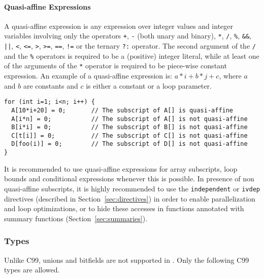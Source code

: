 \paragraph{Quasi-affine Expressions}
\label{sec:quasi-affine}

A quasi-affine expression is any expression over integer values and
integer variables involving only the operators \lstinline{+},
\lstinline{-} (both unary and binary), \lstinline{*}, \lstinline{/},
\lstinline{%}, \lstinline{&&}, \lstinline{||}, \lstinline{<}, \lstinline{<=},
\lstinline{>}, \lstinline{>=}, \lstinline{==}, \lstinline{!=} or the
ternary \lstinline{?:} operator.  The second argument of the
\lstinline{/} and the \lstinline{%}
operators is required to be a (positive) integer literal, while at
least one of the arguments of the \lstinline{*} operator is
required to be piece-wise constant expression. An example of a
quasi-affine expression is: $a*i+b*j+c$, where $a$ and $b$ are
constants and $c$ is either a constant or a loop parameter.

\begin{lstlisting}[language=pencil]
for (int i=1; i<n; i++) {
  A[10*i+20] = 0;       // The subscript of A[] is quasi-affine
  A[i*n] = 0;           // The subscript of A[] is not quasi-affine
  B[i*i] = 0;           // The subscript of B[] is not quasi-affine
  C[t[i]] = 0;          // The subscript of C[] is not quasi-affine
  D[foo(i)] = 0;        // The subscript of D[] is not quasi-affine
}
\end{lstlisting}

It is recommended to use quasi-affine expressions for array subscripts,
loop bounds and conditional expressions whenever this is possible.
In presence of non quasi-affine subscripts, it is highly recommended
to use the \lstinline!independent! or \lstinline!ivdep! directives 
(described in Section~\ref{sec:directives})
in order to enable parallelization and loop optimizations, or to hide these
accesses in functions annotated with summary functions
(Section~\ref{sec:summaries}).


\subsubsection{Types \label{penciltypes}}

Unlike C99, unions and bitfields are not supported in \pencil.
Only the following C99 types are allowed.

